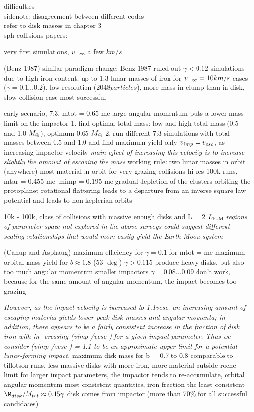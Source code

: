 difficulties\\

sidenote: disagreement between different codes\\


refer to disk masses in chapter 3\\

sph collisions papers:


\citep{Benz:1985p1755}
very first simulations, $v_{+\infty}$ a few $km/s$

\citep{Benz:1989p1893}
(Benz 1987) \citep{1987Icar...71...30B} similar paradigm change: Benz 1987  ruled out $\gamma < 0.12$ simulations due to high iron content. up to $1.3$ lunar masses of iron for $v_{-\infty} = 10km/s$ cases ($\gamma = 0.1 \dots 0.2$). low resolution ($2048 particles$), more mass in clump than in disk, slow collision case most successful


\citep{Cameron:2000p1854}
early scenario, 7:3, mtot = 0.65 me
large angular momentum puts a lower mass limit on the impactor
1. find optimal total mass: low and high total mass (0.5 and 1.0 $M_{\oplus}$), optimum 0.65 $M_{\oplus}$
2. run different 7:3 simulations with total masses between 0.5 and 1.0 and find maximum yield
only $v_{imp} = v_{esc}$, as increasing impactor velocity \emph{main effect of increasing this velocity is to increase slightly the amount of escaping the mass}
working rule: two lunar masses in orbit (anywhere)
most material in orbit for very grazing collisions
hi-res 100k runs, mtar = 0.455 me, mimp = 0.195 me
gradual depletion of the clusters orbiting the protoplanet
rotational flattering leads to a departure from an inverse square law potential and leads to non-keplerian orbits


\citep{Canup:2001p3295}
10k - 100k, class of collisions with massive enough disks and L = 2 $L_{\textrm{E-M}}$
\emph{regions of parameter space not explored in the above surveys could suggest different scaling relationships that would more easily yield the Earth-Moon system}

\cite{Canup:2001p1861} (Canup and Asphaug)
maximum efficiency for $\gamma = 0.1$ for mtot = me
maximum orbital mass yield for $b \approx 0.8 $ (53 $\deg$)
$\gamma > 0.115$ produce heavy disks, but also too much angular momentum
smaller impactors $\gamma = 0.08 \dots 0.09$ don't work, because for the same amount of angular momentum, the impact becomes too grazing


\citep{Canup:2004p115}  \emph{However, as the impact velocity is increased to 1.1vesc, an increasing amount of escaping material yields lower peak disk masses and angular momenta; in addition, there appears to be a fairly consistent increase in the fraction of disk iron with in- creasing	(vimp /vesc ) for a given impact parameter. Thus we consider (vimp /vesc ) = 1.1 to be an approximate upper limit for a potential lunar-forming impact.}
maximum disk mass for b = 0.7 to 0.8
comparable to tillotson runs, less massive disks with more iron, more material outside roche limit
for larger impact parameters, the impactor tends to re-accumulate, 
orbital angular momentum most consistent quantities, iron fraction the least consistent
$\M_{disk} / \Mtot \approx 0.15 \gamma$ 
disk comes from impactor (more than 70\% for all successful candidates)

